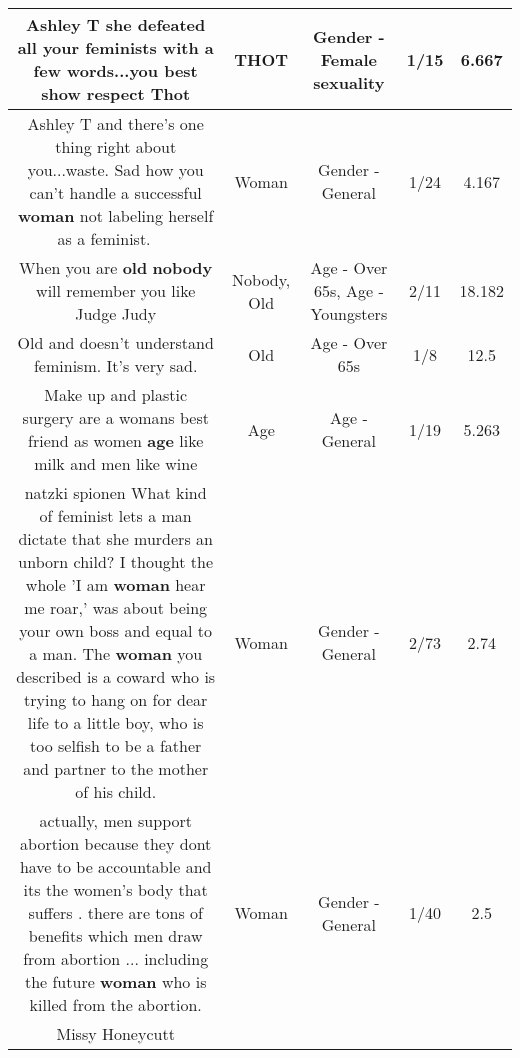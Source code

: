\documentclass[11pt]{article}
\newlength\mylength
\begin{document}
\begin{center}
\begin{longtable}{|C{.65\mylength}|C{.30\mylength}|C{.12\mylength}|C{.12\mylength}|C{.12\mylength}|}
  \small Ashley T she defeated all your feminists with a few words...you best show respect Thot\normalsize   & THOT & Gender - Female sexuality & 1/15 & 6.667 \\  \hline
  \small Ashley T and there's one thing right about you...waste. Sad how you can't handle a successful \textbf{woman} not labeling herself as a feminist. 💅🏼💅🏼\normalsize   & Woman & Gender - General & 1/24 & 4.167 \\  \hline
  \small When you are \textbf{old} \textbf{nobody} will remember you like Judge Judy\normalsize   & Nobody, Old & Age - Over 65s, Age - Youngsters & 2/11 & 18.182 \\  \hline
  \small Old and doesn't understand feminism. It's very sad.\normalsize   & Old & Age - Over 65s & 1/8 & 12.5 \\  \hline
  \small Make up and plastic surgery are a womans best friend as women \textbf{age} like milk and men like wine\normalsize   & Age & Age - General & 1/19 & 5.263 \\  \hline
  \small natzki spionen  What kind of feminist lets a man dictate that she murders an unborn child? I thought the whole 'I am \textbf{woman} hear me roar,' was about being your own boss and equal to a man. The \textbf{woman} you described is a coward who is trying to hang on for dear life to a little boy, who is too selfish to be a father and partner to the mother of his child.\normalsize   & Woman & Gender - General & 2/73 & 2.74 \\  \hline
  \small actually, men support abortion because they dont have to be accountable and its the women's body that suffers . there are tons of benefits which men draw from abortion ... including the  future \textbf{woman} who is killed from the abortion.\normalsize   & Woman & Gender - General & 1/40 & 2.5 \\  \hline
  \small Missy Honeycutt

\end{longtable}
\end{center}
\end{document}
